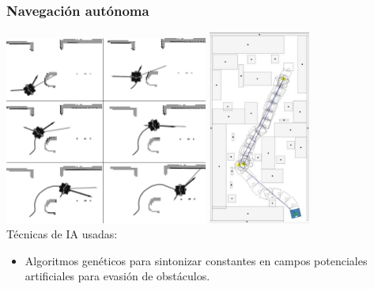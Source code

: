 \documentclass[10pt,spanish,aspectratio=1610]{beamer}
\begin{document}
\begin{frame}\frametitle{Navegación autónoma}
  \centering
  \includegraphics[width=0.50\textwidth]{Figures/PotFields1.png}
  \includegraphics[width=0.25\textwidth]{Figures/PotFields2.png}\\
  Técnicas de IA usadas:
  \begin{itemize}
  \item Algoritmos genéticos para sintonizar constantes en campos potenciales artificiales para evasión de obstáculos. 
  \end{itemize}
\end{frame}
\end{document}
